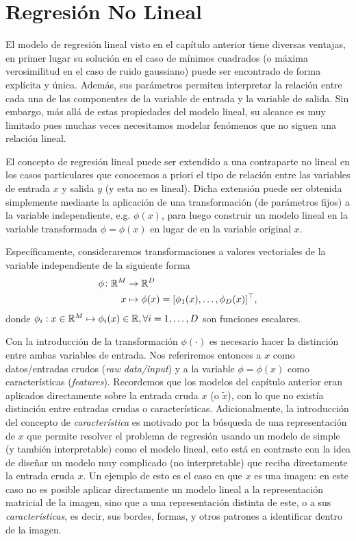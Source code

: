 
\section{Regresión No Lineal}
\label{sec:reg_no_lineal}

El modelo de regresión lineal visto en el capítulo anterior tiene diversas ventajas, en primer lugar su solución en el caso de mínimos cuadrados (o máxima verosimilitud en el caso de ruido gaussiano) puede ser encontrado de forma explícita y única. Además, sus parámetros permiten interpretar la relación entre cada una de las componentes de la variable de entrada y la variable de salida. Sin embargo, más allá de estas propiedades del modelo lineal, su alcance es muy limitado pues muchas veces necesitamos modelar fenómenos que no siguen una relación lineal. 

El concepto de regresión lineal puede ser extendido a una contraparte no lineal en los casos particulares que conocemos a priori el tipo de relación entre las variables de entrada $x$ y salida $y$ (y esta  no es lineal). Dicha extensión puede ser obtenida simplemente mediante la aplicación de una transformación (de parámetros fijos) a la variable independiente, e.g. $\phi(x)$, para luego construir un modelo lineal en la variable transformada $\phi=\phi(x)$ en lugar de en la variable original $x$. 

Específicamente, consideraremos transformaciones a valores vectoriales de la variable independiente de la siguiente forma
\begin{align}
  \phi \colon {\mathbb R}^M &\to {\mathbb R}^D \nonumber\\
  x &\mapsto \phi(x)=[\phi_1(x),\ldots,\phi_D(x)]^\top,
\end{align}
donde $\phi_i: x\in{\mathbb R}^M \mapsto \phi_i(x)\in{\mathbb R}, \forall i=1,\ldots,D$ son funciones escalares. 

Con la introducción de la transformación $\phi(\cdot)$ es necesario hacer la distinción entre ambas variables de entrada. Nos referiremos entonces a $x$ como datos/entradas crudos (\emph{raw data/input}) y a la variable  $\phi=\phi(x)$ como  características (\emph{features}). Recordemos que los modelos del capítulo anterior eran aplicados directamente sobre la entrada cruda $x$ (o $\tilde{x}$), con lo que no existía distinción entre entradas crudas o características. Adicionalmente, la introducción  del concepto de \emph{característica} es motivado por la búsqueda de una representación de $x$ que permite resolver el problema de regresión usando un modelo de simple (y también interpretable) como el modelo lineal, esto está en contraste con la idea de diseñar un modelo muy complicado (no interpretable) que reciba directamente la entrada cruda $x$. Un ejemplo de esto es el caso en que $x$ es una imagen: en este caso no es posible aplicar directamente un modelo lineal a la representación matricial de la imagen, sino que a una representación distinta de este, o a sus \emph{características}, es decir, sus bordes, formas, y otros patrones a identificar dentro de la imagen. 

